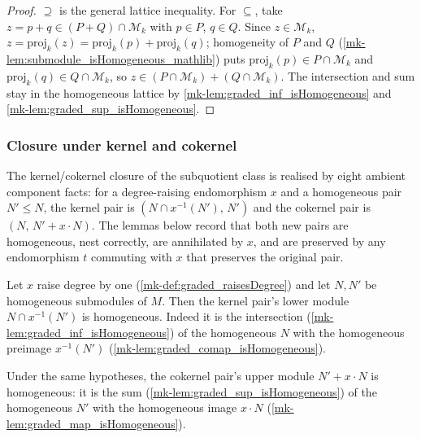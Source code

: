 \begin{proof}
  \leanok
    \(\supseteq\) is the general lattice inequality. For \(\subseteq\), take \(z = p +
  q \in (P + Q) \cap \mathcal{M}_k\) with \(p \in P\), \(q \in Q\). Since \(z \in
  \mathcal{M}_k\), \(z = \mathrm{proj}_k(z) = \mathrm{proj}_k(p) +
  \mathrm{proj}_k(q)\); homogeneity of \(P\) and \(Q\)
  (\ref{mk-lem:submodule_isHomogeneous_mathlib}) puts \(\mathrm{proj}_k(p) \in P \cap
  \mathcal{M}_k\) and \(\mathrm{proj}_k(q) \in Q \cap \mathcal{M}_k\), so \(z \in (P
  \cap \mathcal{M}_k) + (Q \cap \mathcal{M}_k)\). The intersection and sum stay in
  the homogeneous lattice by \ref{mk-lem:graded_inf_isHomogeneous} and
  \ref{mk-lem:graded_sup_isHomogeneous}.
\end{proof}

\subsubsection*{Closure under kernel and cokernel}

The kernel/cokernel closure of the subquotient class is realised by eight ambient
component facts: for a degree-raising endomorphism \(x\) and a homogeneous pair
\(N' \le N\), the kernel pair is \((N \cap x^{-1}(N'),\, N')\) and the cokernel pair is
\((N,\, N' + x \cdot N)\). The lemmas below record that both new pairs are homogeneous,
nest correctly, are annihilated by \(x\), and are preserved by any endomorphism \(t\)
commuting with \(x\) that preserves the original pair.

\begin{lemma}\label{mk-lem:graded_ker_isHomogeneous}
  \leanok

  Let \(x\) raise degree by one (\ref{mk-def:graded_raisesDegree}) and let \(N, N'\) be
  homogeneous submodules of \(M\). Then the kernel pair's lower module
  \(N \cap x^{-1}(N')\) is homogeneous. Indeed it is the intersection
  (\ref{mk-lem:graded_inf_isHomogeneous}) of the homogeneous \(N\) with the homogeneous
  preimage \(x^{-1}(N')\) (\ref{mk-lem:graded_comap_isHomogeneous}).
\end{lemma}

\begin{lemma}\label{mk-lem:graded_coker_isHomogeneous}
  \leanok

  Under the same hypotheses, the cokernel pair's upper module \(N' + x \cdot N\) is
  homogeneous: it is the sum (\ref{mk-lem:graded_sup_isHomogeneous}) of the homogeneous
  \(N'\) with the homogeneous image \(x \cdot N\)
  (\ref{mk-lem:graded_map_isHomogeneous}).
\end{lemma}

